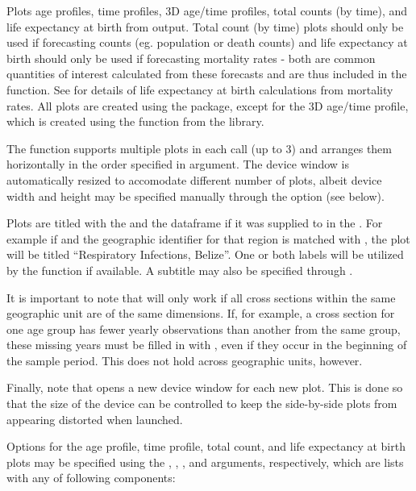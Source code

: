 \begin{Details}\relax
Plots age profiles, time profiles, 3D age/time profiles, total counts (by time), and life expectancy at birth from  output. Total count (by time) plots should only be used if forecasting counts (eg. population or death counts) and life expectancy at birth should only be used if forecasting mortality rates - both are common quantities of interest calculated from these forecasts and are thus included in the function. See  for details of life expectancy at birth calculations from mortality rates. All plots are created using the  package, except for the 3D age/time profile, which is created using the  function from the  library.

The function supports multiple plots in each call (up to 3) and arranges them horizontally in the order specified in  argument. The device window is automatically resized to accomodate different number of plots, albeit device width and height may be specified manually through the  option (see below).

Plots are titled with the  and the  dataframe if it was supplied to  in the . For example if  and the geographic identifier for that region is matched with , the plot will be titled ``Respiratory Infections, Belize''. One or both labels will be utilized by the function if available. A subtitle may also be specified through .

It is important to note that  will only work if
all cross sections within the same geographic unit are of the same
dimensions. If, for example, a cross section for one age group has
fewer yearly observations than another from the same group, these
missing years must be filled in with , even if they occur in
the beginning of the sample period. This does not hold across
geographic units, however.

Finally, note that  opens a new device window for each new
plot. This is done so that the size of the device can be controlled to
keep the side-by-side plots from appearing distorted when launched.


Options for the age profile, time profile, total count, and life expectancy at birth plots may be specified using the , , , and  arguments, respectively, which are lists with any of following components:


\end{Details}
